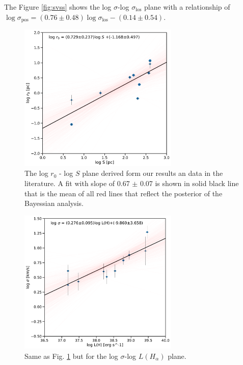 \documentclass[fleqn,usenatbib, useAMS, a4paper]{mnras}
\newcommand\pos{\ensuremath{_{\mathrm{pos}}}}
\begin{document}
The Figure \ref{fig:svss} shows the log \(\sigma\)-log \(\sigma_{\text{los}}\) plane with a relationship of \(\log \sigma\pos = (0.76 \pm 0.48) \log \sigma_{\text{los}}-(0.14 \pm 0.54)\).



\begin{figure}
\centering 
\includegraphics[width=3in]{Figures/rvsS}
\caption{The log \(r_0\) - log \(S\) plane derived form our results an data in the literature. A fit with slope of 0.67 $\pm$ 0.07 is shown in solid black line that is the mean of all red lines that reflect the posterior of the Bayessian analysis. }
\label{fig:rvsR}
\end{figure}

\begin{figure}
\centering 
\includegraphics[width=3in]{Figures/svsL}
\caption{Same as Fig. \ref{fig:rvsR} but for the log $\sigma$-log $L(H_{\alpha})$ plane.}
\label{fig:sigvsl}
\end{figure}
\end{document}
